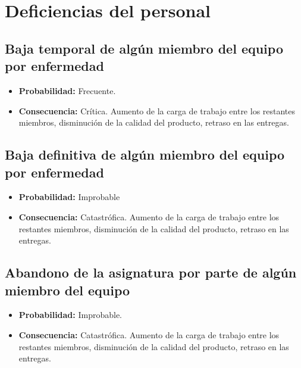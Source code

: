 \documentclass[spanish,a4paper,12pt]{report}	%
\begin{document}


\section{Deficiencias del personal}
%

\subsection*{Baja temporal de algún miembro del equipo por enfermedad}
	\begin{itemize}
		\item \textbf {Probabilidad: }Frecuente.
		\item \textbf {Consecuencia: }Crítica. Aumento de la carga de trabajo entre los restantes miembros, disminución de la calidad del producto, retraso en las entregas.
	\end{itemize}

\subsection*{Baja definitiva de algún miembro del equipo por enfermedad}	
	\begin{itemize}
		\item \textbf {Probabilidad: }Improbable
		\item \textbf {Consecuencia: }Catastrófica. Aumento de la carga de trabajo entre los restantes miembros, disminución de la calidad del producto, retraso en las entregas.
	\end{itemize}

\subsection*{Abandono de la asignatura por parte de algún miembro del equipo}	
	\begin{itemize}
		\item \textbf {Probabilidad: }Improbable.
		\item \textbf {Consecuencia: }Catastrófica. Aumento de la carga de trabajo entre los restantes miembros, disminución de la calidad del producto, retraso en las entregas.
	\end{itemize}
\end{document}
